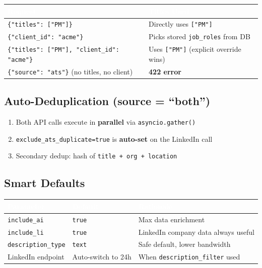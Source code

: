 \documentclass[11pt, a4paper]{article}
\begin{document}
\begin{center}\small
\begin{tabularx}{\textwidth}{|L{5cm}|X|}
\hline
{}
\textcolor{white}{\textbf{Request}} & \textcolor{white}{\textbf{Titles Used}} \\
\hline
\texttt{\{"titles": ["PM"]\}} & Directly uses \texttt{["PM"]} \\
\texttt{\{"client\_id": "acme"\}} & Picks stored \texttt{job\_roles} from DB \\
\texttt{\{"titles": ["PM"], "client\_id": "acme"\}} & Uses \texttt{["PM"]} (explicit override wins) \\
\texttt{\{"source": "ats"\}} (no titles, no client) & \textbf{422 error} \\
\hline
\end{tabularx}
\end{center}

\subsection{Auto-Deduplication (source = ``both'')}

\begin{infobox}[\faClone\hspace{0.5em} When source = "both"]
\begin{enumerate}[leftmargin=1.5em, itemsep=2pt]
    \item Both API calls execute in \textbf{parallel} via \texttt{asyncio.gather()}
    \item \texttt{exclude\_ats\_duplicate=true} is \textbf{auto-set} on the LinkedIn call
    \item Secondary dedup: hash of \texttt{title + org + location}
\end{enumerate}
\end{infobox}

\subsection{Smart Defaults}

\begin{center}\small
\begin{tabularx}{\textwidth}{|L{3.5cm}|C{2.5cm}|X|}
\hline
{}
\textcolor{white}{\textbf{Parameter}} & \textcolor{white}{\textbf{Default}} & \textcolor{white}{\textbf{Rationale}} \\
\hline
\texttt{include\_ai} & \texttt{true} & Max data enrichment \\
\texttt{include\_li} & \texttt{true} & LinkedIn company data always useful \\
\texttt{description\_type} & \texttt{text} & Safe default, lower bandwidth \\
LinkedIn endpoint & Auto-switch to 24h & When \texttt{description\_filter} used \\
\hline
\end{tabularx}
\end{center}
\end{document}
